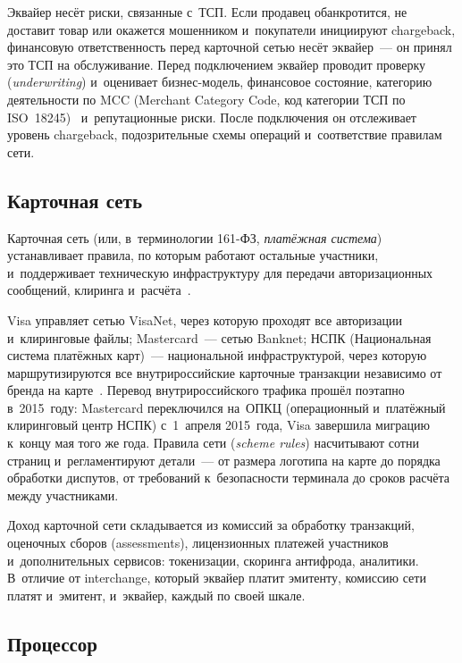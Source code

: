 Эквайер несёт риски, связанные с~ТСП. Если продавец обанкротится, не доставит
товар или окажется мошенником и~покупатели инициируют chargeback, финансовую
ответственность перед карточной сетью несёт эквайер~--- он принял это ТСП на
обслуживание. Перед подключением эквайер проводит проверку (\textit{underwriting})
и~оценивает бизнес-модель, финансовое состояние, категорию деятельности по MCC
(Merchant Category Code, код категории ТСП по ISO~18245)~\cite{iso-18245}
и~репутационные риски. После подключения он отслеживает уровень chargeback,
подозрительные схемы операций и~соответствие правилам сети.

\subsection*{Карточная сеть}

Карточная сеть (или, в~терминологии 161-ФЗ, \emph{платёжная система})
устанавливает правила, по которым работают остальные участники, и~поддерживает
техническую инфраструктуру для передачи авторизационных сообщений, клиринга
и~расчёта~\cite{visa-core-rules,mc-rules,cbr-ps}.

Visa управляет сетью VisaNet, через которую проходят все авторизации
и~клиринговые файлы; Mastercard~--- сетью Banknet; НСПК (Национальная система
платёжных карт)~--- национальной инфраструктурой, через которую
маршрутизируются все внутрироссийские карточные транзакции независимо от бренда
на карте~\cite{nspk-about-company}. Перевод внутрироссийского трафика прошёл поэтапно в~2015~году: Mastercard переключился на~ОПКЦ (операционный и~платёжный
клиринговый центр НСПК) с~1~апреля 2015~года, Visa завершила
миграцию к~концу мая того же года. Правила сети (\textit{scheme rules}) насчитывают
сотни страниц и~регламентируют детали~--- от размера логотипа на карте до
порядка обработки диспутов, от требований к~безопасности терминала до сроков
расчёта между участниками.

Доход карточной сети складывается из комиссий за обработку транзакций,
оценочных сборов (assessments), лицензионных платежей участников
и~дополнительных сервисов: токенизации, скоринга антифрода, аналитики.
В~отличие от interchange, который эквайер платит эмитенту, комиссию сети платят и~эмитент, и~эквайер, каждый по своей шкале.

\subsection*{Процессор}

